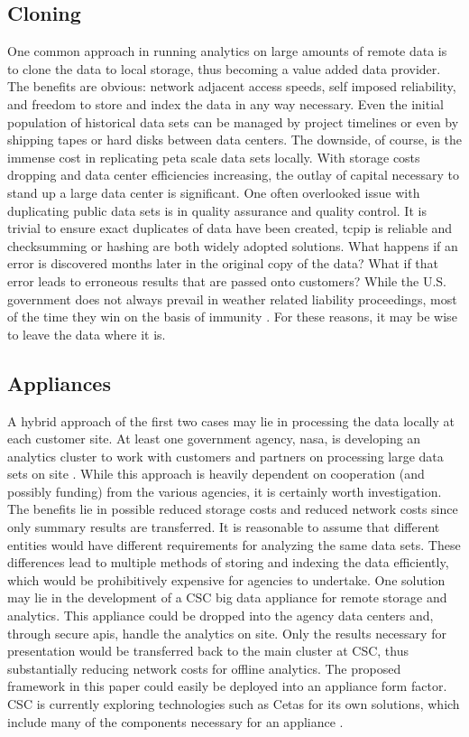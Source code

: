\subsection{Cloning}
One common approach in running analytics on large amounts of remote data is to clone the data to local storage, thus becoming a value added data provider. The benefits are obvious: network adjacent access speeds, self imposed reliability, and freedom to store and index the data in any way necessary. Even the initial population of historical data sets can be managed by project timelines or even by shipping tapes or hard disks between data centers. The downside, of course, is the immense cost in replicating peta scale data sets locally. With storage costs dropping and data center efficiencies increasing, the outlay of capital necessary to stand up a large data center is significant. One often overlooked issue with duplicating public data sets is in quality assurance and quality control. It is trivial to ensure exact duplicates of data have been created, \gls{tcpip} is reliable and checksumming or hashing are both widely adopted solutions. What happens if an error is discovered months later in the original copy of the data? What if that error leads to erroneous results that are passed onto customers?  While the U.S. government does not always prevail in weather related liability proceedings, most of the time they win on the basis of immunity \cite[Chapter~4]{fairweather}. For these reasons, it may be wise to leave the data where it is.
\subsection{Appliances}
A hybrid approach of the first two cases may lie in processing the data locally at each customer site. At least one government agency, \gls{nasa}, is developing an analytics cluster to work with customers and partners on processing large data sets on site \cite{duffy}. While this approach is heavily dependent on cooperation (and possibly funding) from the various agencies, it is certainly worth investigation. The benefits lie in possible reduced storage costs and reduced network costs since only summary results are transferred. It is reasonable to assume that different entities would have different requirements for analyzing the same data sets. These differences lead to multiple methods of storing and indexing the data efficiently, which would be prohibitively expensive for agencies to undertake.  One solution may lie in the development of a \textsc{CSC} big data appliance for remote storage and analytics. This appliance could be dropped into the agency data centers and, through secure \gls{api}s, handle the analytics on site. Only the results necessary for presentation would be transferred back to the main cluster at \textsc{CSC}, thus substantially reducing network costs for offline analytics. The proposed framework in this paper could easily be deployed into an appliance form factor. \textsc{CSC} is currently exploring technologies such as Cetas for its own solutions, which include many of the components necessary for an appliance \cite{cetas}.\\

